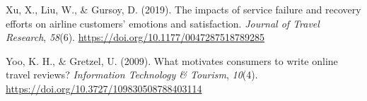 \documentclass[
]{agujournal2019}
\newlength{\cslhangindent}
\newenvironment{CSLReferences}[2] %
 {\begin{list}{}{%
  \setlength{\itemindent}{0pt}
  \setlength{\leftmargin}{0pt}
  \setlength{\parsep}{0pt}
  \ifodd #1
   \setlength{\leftmargin}{\cslhangindent}
   \setlength{\itemindent}{-1\cslhangindent}
  \fi
  \setlength{\itemsep}{#2\baselineskip}}}
 {\end{list}}
\begin{document}
\begin{CSLReferences}{1}{0}
Xu, X., Liu, W., \& Gursoy, D. (2019). The impacts of service failure
and recovery efforts on airline customers' emotions and satisfaction.
\emph{Journal of Travel Research}, \emph{58}(6).
\url{https://doi.org/10.1177/0047287518789285}

Yoo, K. H., \& Gretzel, U. (2009). What motivates consumers to write
online travel reviews? \emph{Information Technology \& Tourism},
\emph{10}(4). \url{https://doi.org/10.3727/109830508788403114}

\end{CSLReferences}
\end{document}
